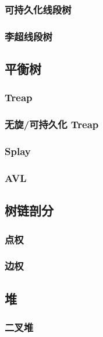 \documentclass[a4paper, twoside]{article}
\begin{document}
    \subsubsection{可持久化线段树}

    \subsubsection{李超线段树}

\subsection{平衡树}
    \subsubsection{Treap}

    \subsubsection{无旋/可持久化 Treap}

    \subsubsection{Splay}

    \subsubsection{AVL}

\subsection{树链剖分}
    \subsubsection{点权}

    \subsubsection{边权}

\subsection{堆}
    \subsubsection{二叉堆}
    
\end{document}

